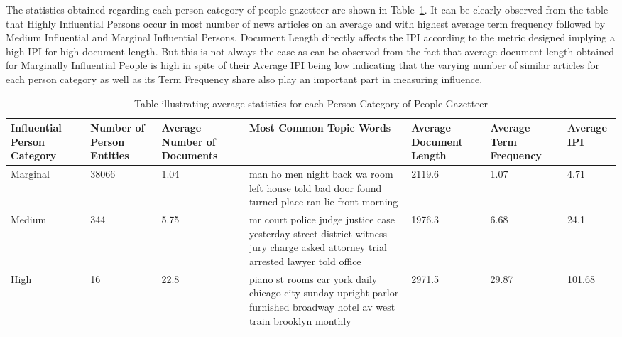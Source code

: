 The statistics obtained regarding each person category of people gazetteer are shown in Table~\ref{table:stats}. 
It can be clearly observed from the table that Highly Influential Persons occur in most number of news articles on an average and with highest average term frequency followed by Medium Influential and Marginal Influential Persons. Document Length directly affects the IPI according to the metric designed implying a high IPI for high document length. But this is not always the case as can be observed from the fact that average document length obtained for Marginally Influential People is high in spite of their Average IPI being low indicating that the varying number of similar articles for each person category as well as its Term Frequency share also play an important part in measuring influence.


\begin{table}
\begin{center}
    \begin{tabular}{|p{2cm}|p{2cm}|p{2cm}|p{3.5cm}|p{2cm}|p{2cm}|p{1.5cm}|}
    \hline
    \textbf{Influential Person Category}  &  \textbf{Number of Person Entities}   & \textbf{Average Number of Documents}  &  \textbf{Most Common Topic Words} &  \textbf{Average Document Length}	&  \textbf{Average Term Frequency}	&	\textbf{Average IPI}\\  \hline
Marginal & 38066 & 1.04 & man ho men night back wa room left house told bad door found turned place ran lie front morning & 2119.6 & 1.07 &	4.71	\\ \hline
Medium & 344 & 5.75 & mr court police judge justice case yesterday street district witness jury charge asked attorney trial arrested lawyer told office & 1976.3 & 6.68 & 24.1	 \\ \hline
High & 16 & 22.8 & piano st rooms car york daily chicago city sunday upright parlor furnished broadway hotel av west train brooklyn monthly & 2971.5 & 29.87	&	101.68	 \\	\hline 
  \end{tabular}
  \end{center}
    \caption {Table illustrating average statistics for each Person Category of People Gazetteer }
\label{table:stats}
\end{table}


